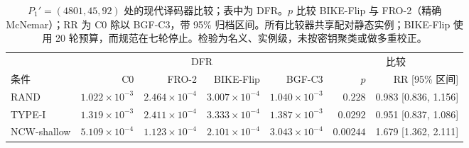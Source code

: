 \begin{table}[!t]
\centering
\small
\caption{$P_1'=(4801,45,92)$ 处的现代译码器比较；表中为 DFR。$p$ 比较 BIKE-Flip 与 FRO-2（精确 McNemar）；RR 为 C0 除以 BGF-C3，带 95\% 归档区间。所有比较器共享配对静态实例；BIKE-Flip 使用 20 轮预算，而规范在七轮停止。检验为名义、实例级，未按密钥聚类或做多重校正。}
\label{tab:modern}
\begin{tabular}{lrrrrrr}
\toprule
 & \multicolumn{4}{c}{DFR} & \multicolumn{2}{c}{比较} \\
\cmidrule(lr){2-5} \cmidrule(lr){6-7}
条件 & C0 & FRO-2 & BIKE-Flip & BGF-C3 & $p$ & RR [95\% 区间] \\
\midrule
RAND & $1.022\times10^{-3}$ & $2.464\times10^{-4}$ & $3.007\times10^{-4}$ & $1.040\times10^{-3}$ & $0.228$ & 0.983 [0.836, 1.156] \\
TYPE-I & $1.319\times10^{-3}$ & $2.411\times10^{-4}$ & $3.333\times10^{-4}$ & $1.387\times10^{-3}$ & $0.0292$ & 0.951 [0.837, 1.086] \\
NCW-shallow & $5.109\times10^{-4}$ & $1.123\times10^{-4}$ & $2.101\times10^{-4}$ & $3.043\times10^{-4}$ & $0.00244$ & 1.679 [1.362, 2.111] \\
\bottomrule
\end{tabular}
\end{table}
